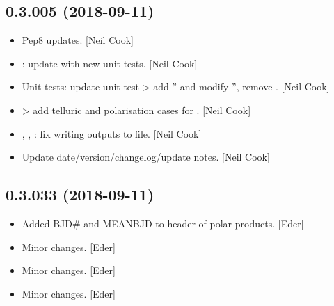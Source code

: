 \documentclass[a4paper,10pt,english]{report}
\begin{document}
\subsection{0.3.005 (2018-09-11)}
\label{\detokenize{misc/changelog:id329}}\begin{itemize}
\item {} 
Pep8 updates. {[}Neil Cook{]}

\item {} 
: update with new unit tests. {[}Neil Cook{]}

\item {} 
Unit tests: update unit test \textendash{}\textgreater{} add ” and modify
”, remove . {[}Neil Cook{]}

\item {} 
 \textendash{}\textgreater{} add telluric and polarisation cases for
. {[}Neil Cook{]}

\item {} 
, , : fix writing outputs
to file. {[}Neil Cook{]}

\item {} 
Update date/version/changelog/update notes. {[}Neil Cook{]}

\end{itemize}


\subsection{0.3.033 (2018-09-11)}
\label{\detokenize{misc/changelog:id330}}\begin{itemize}
\item {} 
Added BJD\# and MEANBJD to header of polar products. {[}Eder{]}

\item {} 
Minor changes. {[}Eder{]}

\item {} 
Minor changes. {[}Eder{]}

\item {} 
Minor changes. {[}Eder{]}

\end{itemize}
\end{document}
